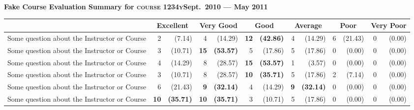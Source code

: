 \documentclass[12pt, oneside, landscape]{memoir}
\newcommand{\myrowcolour}{\rowcolor[gray]{0.925}}
\newcommand{\cheading}[2]{\textbf{#1\hfill #2}}
\newcommand{\highest}[1]{\textbf{#1}}%
\newcommand{\cheading}[2]{\textcolor{Maroon}{\textbf{#1\hfill #2}}}
\newcommand{\highest}[1]{\textcolor{Maroon}{\textbf{#1}}}%
\begin{document}
	\thispagestyle{empty}
	\parindent0pt
	
	\cheading{Fake Course Evaluation Summary for \textsc{course
			1234y}}{Sept.\ 2010 --- May 2011}
	
	\begin{longtable}{@{}l rr rr rr rr rr rr}
		
		\toprule%
		\centering%
		& \multicolumn{2}{c}{{{\bfseries Excellent}}}
		& \multicolumn{2}{c}{{{\bfseries Very Good}}}
		& \multicolumn{2}{c}{{{\bfseries Good}}}
		& \multicolumn{2}{c}{{{\bfseries Average}}}
		& \multicolumn{2}{c}{{{\bfseries Poor}}}
		& \multicolumn{2}{c}{{{\bfseries Very Poor}}} \\
		
		
		\cmidrule[0.4pt](r{0.125em}){1-1}%
		\cmidrule[0.4pt](lr{0.125em}){2-3}%
		\cmidrule[0.4pt](lr{0.125em}){4-5}%
		\cmidrule[0.4pt](lr{0.125em}){6-7}%
		\cmidrule[0.4pt](lr{0.125em}){8-9}%
		\cmidrule[0.4pt](lr{0.125em}){10-11}%
		\cmidrule[0.4pt](l{0.25em}){12-13}%
		\endhead
		
		
		Some question about the Instructor or Course & 2 & (7.14) & 4 &
		(14.29) & \highest{12} & \highest{(42.86)} & 4
		& (14.29) & 6 & (21.43) & 0 & (0.00) \\
		
		\myrowcolour%
		Some question about the Instructor or Course & 3 & (10.71) &
		\highest{15} & \highest{(53.57)} & 5 & (17.86) & 5 & (17.86) & 0 &
		(0.00) & 0 & (0.00) \\
		
		Some question about the Instructor or Course & 4 & (14.29) & 8 &
		(28.57) & \highest{15}
		& \highest{(53.57)} & 1 & (3.57) & 0 & (0.00) & 0 & (0.00) \\
		
		\myrowcolour%
		Some question about the Instructor or Course & 3 & (10.71) & 8 &
		(28.57) & \highest{10} & \highest{(35.71)}
		& 5 & (17.86) & 2 & (7.14) & 0 & (0.00) \\
		
		Some question about the Instructor or Course & 6 & (21.43) &
		\highest{9} & \highest{(32.14)}
		& 4 & (14.29) & \highest{9} & \highest{(32.14)} & 0 & (0.00) & 0 & (0.00) \\
		
		\myrowcolour%
		Some question about the Instructor or Course & \highest{10} &
		\highest{(35.71)} & \highest{10} & \highest{(35.71)}
		& 3 & (10.71) & 5 & (17.86) & 0 & (0.00) & 0 & (0.00) \\
		

\end{longtable}
\end{document}
